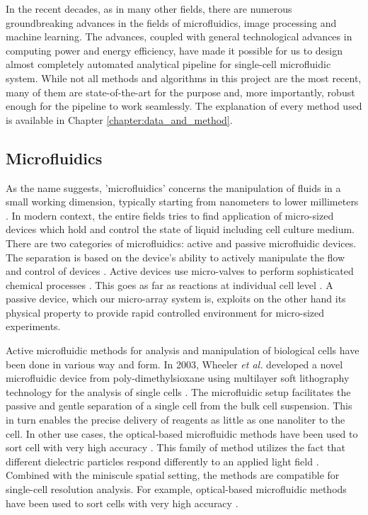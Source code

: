 \documentclass[pdftex,12pt,a4paper]{report}
\begin{document}
In the recent decades, as in many other fields, there are numerous groundbreaking advances in the fields of microfluidics, image processing and machine learning. The advances, coupled with general technological advances in computing power and energy efficiency, have made it possible for us to design almost completely automated analytical pipeline for single-cell microfluidic system. While not all methods and algorithms in this project are the most recent, many of them are state-of-the-art for the purpose and, more importantly, robust enough for the pipeline to work seamlessly. The explanation of every method used is available in Chapter \ref{chapter:data_and_method}.

\subsection{Microfluidics}

As the name suggests, 'microfluidics' concerns the manipulation of fluids in a small working dimension, typically starting from nanometers to lower millimeters \cite{whitesides2006origins}. In modern context, the entire fields tries to find application of micro-sized devices which hold and control the state of liquid \cite{whitesides2006origins} including cell culture medium. There are two categories of microfluidics: active and passive microfluidic devices. The separation is based on the device's ability to actively manipulate the flow and control of devices \cite{sekhavati2015dynamic}. Active devices use micro-valves to perform sophisticated chemical processes \cite{marsden1993interdisciplinary}. This goes as far as reactions at individual cell level \cite{eyer2012microchamber}. A passive device, which our micro-array system is, exploits on the other hand its physical property to provide rapid controlled environment for micro-sized experiments.

Active microfluidic methods for analysis and manipulation of biological cells have been done in various way and form. In 2003, Wheeler \textit{et al.} developed a novel microfluidic device from poly-dimethylsioxane using multilayer soft lithography technology for the analysis of single cells \cite{wheeler2003microfluidic}. The microfluidic setup facilitates the passive and gentle separation of a single cell from the bulk cell suspension. This in turn enables the precise delivery of reagents as little as one nanoliter to the cell. In other use cases, the optical-based microfluidic methods have been used to sort cell with very high accuracy \cite{macdonald2003microfluidic}. This family of method utilizes the fact that different dielectric particles respond differently to an applied light field \cite{tatarkova2003brownian}. Combined with the miniscule spatial setting, the methods are compatible for single-cell resolution analysis. For example, optical-based microfluidic methods have been used to sort cells with very high accuracy \cite{macdonald2003microfluidic, wang2005microfluidic, baret2009fluorescence}.
\end{document}
